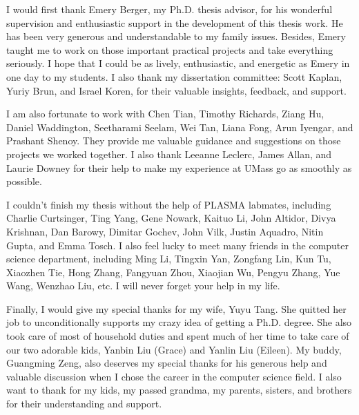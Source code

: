I would first thank Emery Berger, my Ph.D. thesis advisor, for his wonderful supervision and enthusiastic support in the development of this thesis work. He has been very generous and understandable to my family issues. Besides, Emery taught me to work on those important practical projects and take everything seriously. I hope that I could be as lively, enthusiastic, and energetic as Emery in one day to my students.  I also thank my dissertation committee: Scott Kaplan, Yuriy Brun, and Israel Koren, for their valuable insights, feedback, and support. 

I am also fortunate to work with Chen Tian, Timothy Richards, Ziang Hu, Daniel Waddington, Seetharami Seelam, Wei Tan, Liana Fong, Arun Iyengar, and Prashant Shenoy. They provide me valuable guidance and suggestions on those projects we worked together. I also thank Leeanne Leclerc, James Allan, and Laurie Downey for their help to make my experience at UMass go as smoothly as possible. 

I couldn't finish my thesis without the help of PLASMA  labmates, including Charlie Curtsinger, Ting Yang, Gene Nowark, Kaituo Li, John Altidor, Divya Krishnan, Dan Barowy, Dimitar Gochev, John Vilk, Justin Aquadro,  Nitin Gupta, and Emma Tosch. I also feel lucky to meet many friends in the computer science department, including Ming Li, Tingxin Yan, Zongfang Lin, Kun Tu, Xiaozhen Tie, Hong Zhang, Fangyuan Zhou, Xiaojian Wu, Pengyu Zhang, Yue Wang, Wenzhao Liu, etc. I will never forget your help in my life. 

Finally, I would give my special thanks for my wife, Yuyu Tang. She quitted her job to unconditionally supports my crazy idea of getting a Ph.D. degree. She also took care of most of household duties and spent much of her time to take care of our two adorable kids, Yanbin Liu (Grace) and Yanlin Liu (Eileen). My buddy, Guangming Zeng, also deserves my special thanks for his generous help and valuable discussion when I chose the career in the computer science field. I also want to thank for my kids, my passed grandma, my parents, sisters, and brothers for their understanding and support.    

